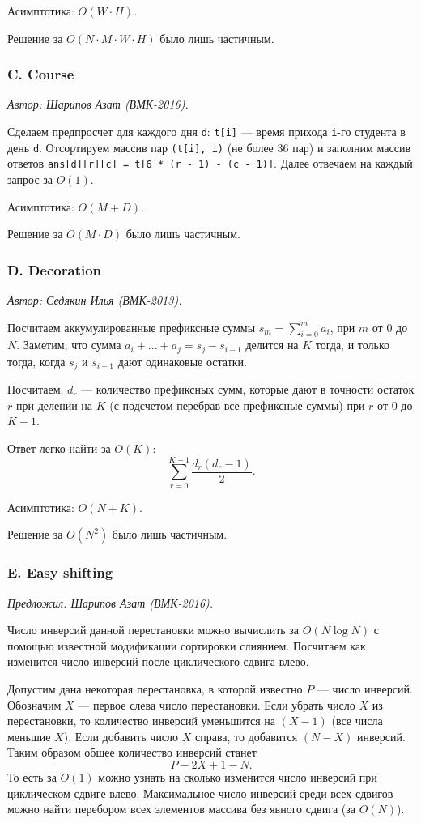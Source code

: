 \documentclass[11pt, a4paper]{article}
\newcommand{\problemauthor}[1]{
\begin{flushright}
\textit{Автор: #1}
\end{flushright}
}
\newcommand{\problemofferer}[1]{
\begin{flushright}
\textit{Предложил: #1}
\end{flushright}
}
\begin{document}
Асимптотика: $O(W \cdot H)$. 

Решение за $O(N \cdot M \cdot W \cdot H)$ было лишь частичным.

\subsubsection*{C. Course}


\problemauthor{Шарипов Азат (ВМК-2016).}

Сделаем предпросчет для каждого дня {\tt d}: {\tt t[i]} --- время прихода {\tt i}-го студента в день {\tt d}. Отсортируем массив пар {\tt (t[i], i)} (не более 36 пар) и заполним массив ответов {\tt ans[d][r][c] = t[6 * (r - 1) - (c - 1)]}. Далее отвечаем на каждый запрос за $O(1)$.

Асимптотика: $O(M + D)$. 

Решение за $O(M \cdot D)$ было лишь частичным.

\subsubsection*{D. Decoration}


\problemauthor{Седякин Илья (ВМК-2013).}

Посчитаем аккумулированные префиксные суммы $s_m = \sum_{i=0}^m a_i$, при $m$ от 0 до $N$. Заметим, что сумма $a_{i} + ... + a_{j} = s_j - s_{i-1}$ делится на $K$ тогда, и только тогда, когда $s_j$ и $s_{i-1}$ дают одинаковые остатки. 

Посчитаем, $d_r$ --- количество префиксных сумм, которые дают в точности остаток $r$ при делении на $K$ (с подсчетом перебрав все префиксные суммы) при $r$ от 0 до $K-1$. 

Ответ легко найти за $O(K)$: $$\sum\limits_{r = 0}^{K-1} \frac{d_r(d_r - 1)}{2}.$$

Асимптотика: $O(N + K)$. 

Решение за $O(N^2)$ было лишь частичным.

\subsubsection*{E. Easy shifting}


\problemofferer{Шарипов Азат (ВМК-2016).}

Число инверсий данной перестановки можно вычислить за $O(N \log N)$ с помощью известной модификации сортировки слиянием. Посчитаем как изменится число инверсий после циклического сдвига влево.

Допустим дана некоторая перестановка, в которой известно $P$ --- число инверсий. Обозначим $X$ --- первое слева число перестановки. Если убрать число $X$ из перестановки, то количество инверсий уменьшится на $(X - 1)$ (все числа меньшие $X$). Если добавить число $X$ справа, то добавится $(N - X)$ инверсий. Таким образом общее количество инверсий станет $$P - 2 X + 1 - N.$$ 
То есть за $O(1)$ можно узнать на сколько изменится число инверсий при циклическом сдвиге влево. Максимальное число инверсий среди всех сдвигов можно найти перебором всех элементов массива без явного сдвига (за $O(N)$).
\end{document}
